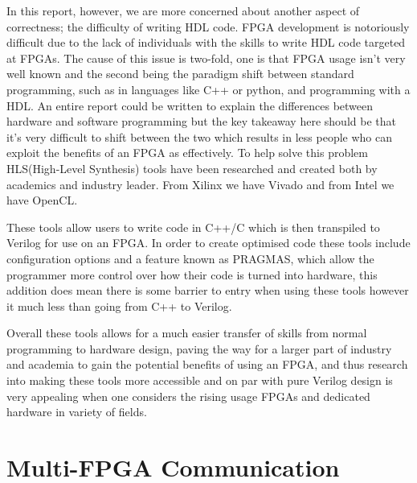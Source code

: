In this report, however, we are more concerned about another aspect of correctness; the difficulty of writing HDL code. FPGA development is notoriously difficult due to the lack of individuals with the skills to write HDL code targeted at FPGAs. The cause of this issue is two-fold, one is that FPGA usage isn't very well known and the second being the paradigm shift between standard programming, such as in languages like C++ or python, and programming with a HDL. An entire report could be written to explain the differences between hardware and software programming but the key takeaway here should be that it's very difficult to shift between the two which results in less people who can exploit the benefits of an FPGA as effectively. To help solve this problem HLS(High-Level Synthesis) tools have been researched and created both by academics and industry leader. From Xilinx we have Vivado and from Intel we have OpenCL.

These tools allow users to write code in C++/C which is then transpiled to Verilog for use on an FPGA. In order to create optimised code these tools include configuration options and a feature known as PRAGMAS, which allow the programmer more control over how their code is turned into hardware, this addition does mean there is some barrier to entry when using these tools however it much less than going from C++ to Verilog. 

Overall these tools allows for a much easier transfer of skills from normal programming to hardware design, paving the way for a larger part of industry and academia to gain the potential benefits of using an FPGA, and thus research into making these tools more accessible and on par with pure Verilog design is very appealing when one considers the rising usage FPGAs and dedicated hardware in variety of fields.

\section{Multi-FPGA Communication}




 